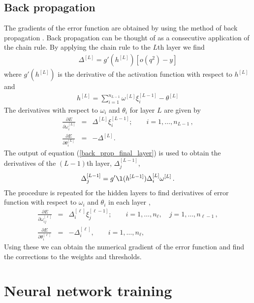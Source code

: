\subsection{Back propagation}
The gradients of the error function are obtained by using the method of back propagation \cite{Demuth:2014}. 
Back propagation can be thought of as a consecutive application of the chain rule. By applying the chain rule to the $L$th layer we find \cite{Grant:2019yar}
%
\begin{eqnarray}\label{back_prop_final_layer}
\Delta^{[L]}= g'(h^{[L]})[o(q^2)-y]
\end{eqnarray} 
%
where $g'(h^{[L]})$ is the derivative of the activation function with respect to $h^{[L]}$ and 
%
\begin{eqnarray}\label{h_of_L}
h^{[L]}=\sum_{i=1}^{n_{L-1}}\omega^{[L]}\xi_{i}^{[L-1]}-\theta^{[L]}
\end{eqnarray} 
%
The derivatives with respect to $\omega_i$ and $\theta_i$ for layer $L$ are given by \cite{Grant:2019yar}
\begin{eqnarray}\label{delta}
 \frac{\partial
E}{\partial\omega_{i}^{[L]}} &=&
\Delta^{[L]}\xi_i^{[L-1]};\qquad
i=1,\ldots,n_{L-1}\,, \nonumber \\ \frac{\partial
E}{\partial\theta_{i}^{[L]}} &=& -
\Delta^{[L]}.
\end{eqnarray}
%
The output of equation (\ref{back_prop_final_layer}) is used to obtain the derivatives of the $(L-1)$th layer, $\Delta_j^{[L-1]}$,
%
\begin{eqnarray}
\Delta_j^{[L-1]}=g'\l(h^{[L-1]})
\Delta_i^{[L]}\omega^{[L]}\,.
\end{eqnarray}
%
The procedure is repeated for the hidden layers to find derivatives of error function with respect to $\omega_i$ and $\theta_i$ in each layer \cite{Grant:2019yar}, 
%
\begin{eqnarray}\label{delta1}
 \frac{\partial
E}{\partial\omega_{ij}^{[\ell]}} &=&
\Delta_i^{[\ell]}\xi_j^{[\ell-1]};\qquad
i=1,\ldots,n_\ell,\quad j=1,\ldots,n_{\ell-1}\,, \nonumber \\ 
\frac{\partial E}{\partial\theta_{i}^{[\ell]}} &=& -
\Delta_i^{[\ell]},\qquad i=1,\ldots,n_\ell,
\end{eqnarray}
%
Using these we can obtain the numerical gradient of the error function and find the corrections to the weights and thresholds. 

\section{Neural network training}

